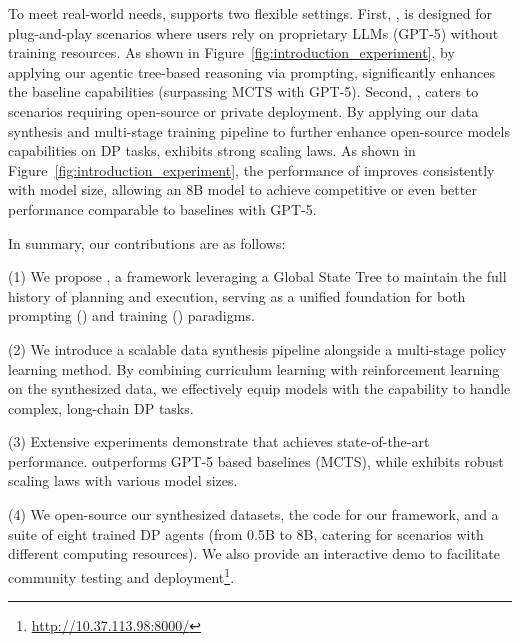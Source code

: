  To meet real-world needs, \sys supports two flexible settings.
First, \textbf{\sysp}, is designed for {plug-and-play} scenarios where users rely on proprietary LLMs (\eg GPT-5) without training resources. As shown in Figure~\ref{fig:introduction_experiment}, by applying our agentic tree-based reasoning via prompting, \sysp significantly enhances the baseline capabilities (surpassing MCTS with GPT-5). 
Second, \textbf{\syst}, caters to scenarios requiring {open-source or private} deployment. By applying our data synthesis and multi-stage training pipeline to further enhance open-source models capabilities on DP tasks, \syst exhibits strong {scaling laws}. As shown in Figure~\ref{fig:introduction_experiment}, the performance of \syst improves consistently with model size, allowing an 8B model to achieve competitive or even better performance comparable to baselines with GPT-5.

In summary, our contributions are as follows:

    (1) We propose \sys, a framework leveraging a Global State Tree to maintain the full history of planning and execution, serving as a unified foundation for both prompting (\sysp) and training (\syst) paradigms.
    
    (2) We introduce a scalable data synthesis pipeline alongside a multi-stage policy learning method. By combining curriculum learning with reinforcement learning on the synthesized data, we effectively equip models with the capability to handle complex, long-chain DP tasks.
    
    (3) Extensive experiments demonstrate that \sys achieves state-of-the-art performance. \sysp outperforms GPT-5 based baselines (\eg MCTS), while \syst exhibits robust scaling laws with various model sizes.

    (4) We open-source our synthesized datasets, the code for our framework, and a suite of eight trained DP agents (from 0.5B to 8B, catering for scenarios with different computing resources). We also provide an interactive demo to facilitate community testing and deployment\footnote{\url{http://10.37.113.98:8000/}}.
